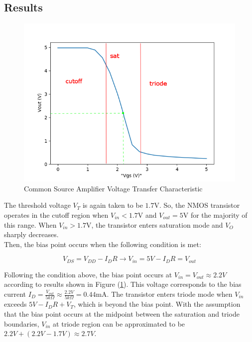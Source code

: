 \subsection{Results}

\FloatBarrier

\begin{figure}[h!]
	\centering
	\includegraphics[scale=0.50]{../data/common_source_edited.png}
	\caption{Common Source Amplifier Voltage Transfer Characteristic}
	\label{fig:common_source}
\end{figure}

\FloatBarrier

The threshold voltage $V_T$ is again taken to be $1.7$\si{\volt}.
So, the NMOS transistor operates in the cutoff region when $V_{in} < 1.7$\si{\volt} and $V_{out} = 5$\si{\volt} for the majority of this range.
When $V_{in} > 1.7$\si{\volt}, the transistor enters saturation mode and $V_{O}$ sharply decreases. \\
Then, the bias point occurs when the following condition is met:

\begin{equation}
	\label{eq:bias_nmos_csa}
	V_{DS} = V_{DD} - I_{D}R \rightarrow V_{in} = 5V - I_{D}R = V_{out}
\end{equation}

Following the condition above, the bias point occurs at $V_{in} = V_{out} \approx 2.2V$ according to results shown in Figure (\ref{fig:common_source}).
This voltage corresponds to the bias current $I_{D} = \frac{V_{out}}{5k\Omega} \approx \frac{2.2V}{5k\Omega} = 0.44$\si{\milli\ampere}.
The transistor enters triode mode when $V_{in}$ exceeds $5V - I_{D}R + V_T$, which is beyond the bias point.
With the assumption that the bias point occurs at the midpoint between the saturation and triode boundaries, $V_{in}$ at triode region can be approximated to be $2.2V + (2.2V - 1.7V) \approx 2.7V$.

